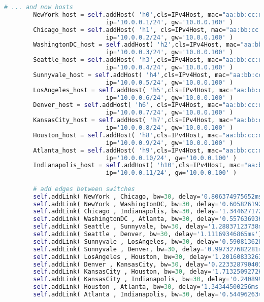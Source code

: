 \begin{lstlisting}[language=Python]
        # ... and now hosts
        NewYork_host = self.addHost( 'h0',cls=IPv4Host, mac="aa:bb:cc:dd:ee:11",
                            ip='10.0.0.1/24', gw='10.0.0.100' )
        Chicago_host = self.addHost( 'h1', cls=IPv4Host, mac="aa:bb:cc:dd:ee:22",
                            ip='10.0.0.2/24', gw='10.0.0.100' )
        WashingtonDC_host = self.addHost( 'h2',cls=IPv4Host, mac="aa:bb:cc:dd:ee:33",
                            ip='10.0.0.3/24', gw='10.0.0.100' )
        Seattle_host = self.addHost( 'h3',cls=IPv4Host, mac="aa:bb:cc:dd:ee:44",
                            ip='10.0.0.4/24', gw='10.0.0.100' )
        Sunnyvale_host = self.addHost( 'h4',cls=IPv4Host, mac="aa:bb:cc:dd:ee:55",
                            ip='10.0.0.5/24', gw='10.0.0.100' )
        LosAngeles_host = self.addHost( 'h5',cls=IPv4Host, mac="aa:bb:cc:dd:ee:66",
                            ip='10.0.0.6/24', gw='10.0.0.100' )
        Denver_host = self.addHost( 'h6', cls=IPv4Host, mac="aa:bb:cc:dd:ee:77",
                            ip='10.0.0.7/24', gw='10.0.0.100' )
        KansasCity_host = self.addHost( 'h7',cls=IPv4Host, mac="aa:bb:cc:dd:ee:88",
                            ip='10.0.0.8/24', gw='10.0.0.100' )
        Houston_host = self.addHost( 'h8',cls=IPv4Host, mac="aa:bb:cc:dd:ee:99",
                            ip='10.0.0.9/24', gw='10.0.0.100' )
        Atlanta_host = self.addHost( 'h9',cls=IPv4Host, mac="aa:bb:cc:dd:ee:10",
                            ip='10.0.0.10/24', gw='10.0.0.100' )
        Indianapolis_host = self.addHost( 'h10',cls=IPv4Host, mac="aa:bb:cc:dd:ee:11",
                            ip='10.0.0.11/24', gw='10.0.0.100' )

        # add edges between switches
        self.addLink( NewYork , Chicago, bw=30, delay='0.806374975652ms')
        self.addLink( NewYork , WashingtonDC, bw=30, delay='0.605826192092ms')
        self.addLink( Chicago , Indianapolis, bw=30, delay='1.34462717203ms')
        self.addLink( WashingtonDC , Atlanta, bw=30, delay='0.557636936322ms')
        self.addLink( Seattle , Sunnyvale, bw=30, delay='1.28837123738ms')
        self.addLink( Seattle , Denver, bw=30, delay='1.11169346865ms')
        self.addLink( Sunnyvale , LosAngeles, bw=30, delay='0.590813628707ms')
        self.addLink( Sunnyvale , Denver, bw=30, delay='0.997327682281ms')
        self.addLink( LosAngeles , Houston, bw=30, delay='1.20160833263ms')
        self.addLink( Denver , KansasCity, bw=30, delay='0.223328790403ms')
        self.addLink( KansasCity , Houston, bw=30, delay='1.71325092726ms')
        self.addLink( KansasCity , Indianapolis, bw=30, delay='0.240899959477ms')
        self.addLink( Houston , Atlanta, bw=30, delay='1.34344500256ms')
        self.addLink( Atlanta , Indianapolis, bw=30, delay='0.544962634977ms')



\end{lstlisting}
